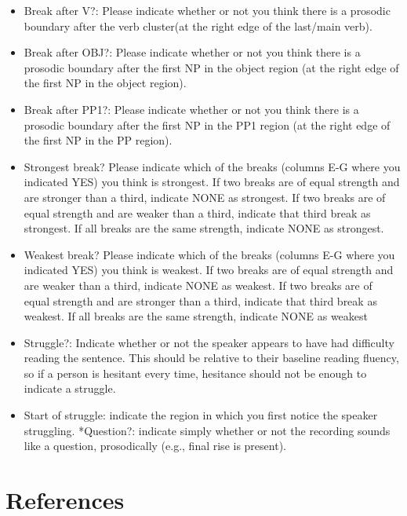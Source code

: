 \documentclass[11pt,oneside]{book}
\providecommand{\tightlist}{%
  \setlength{\itemsep}{0pt}\setlength{\parskip}{0pt}}
\begin{document}
\begin{itemize}
\tightlist
\item
  Break after V?: Please indicate whether or not you think there is a prosodic boundary after the verb cluster(at the right edge of the last/main verb).
\item
  Break after OBJ?: Please indicate whether or not you think there is a prosodic boundary after the first NP in the object region (at the right edge of the first NP in the object region).
\item
  Break after PP1?: Please indicate whether or not you think there is a prosodic boundary after the first NP in the PP1 region (at the right edge of the first NP in the PP region).
\item
  Strongest break? Please indicate which of the breaks (columns E-G where you indicated YES) you think is strongest. If two breaks are of equal strength and are stronger than a third, indicate NONE as strongest. If two breaks are of equal strength and are weaker than a third, indicate that third break as strongest. If all breaks are the same strength, indicate NONE as strongest.
\item
  Weakest break? Please indicate which of the breaks (columns E-G where you indicated YES) you think is weakest. If two breaks are of equal strength and are weaker than a third, indicate NONE as weakest. If two breaks are of equal strength and are stronger than a third, indicate that third break as weakest. If all breaks are the same strength, indicate NONE as weakest
\item
  Struggle?: Indicate whether or not the speaker appears to have had difficulty reading the sentence. This should be relative to their baseline reading fluency, so if a person is hesitant every time, hesitance should not be enough to indicate a struggle.
\item
  Start of struggle: indicate the region in which you first notice the speaker struggling.
  *Question?: indicate simply whether or not the recording sounds like a question, prosodically (e.g., final rise is present).
\end{itemize}

\clearpage

\hypertarget{references}{%
\chapter*{References}\label{references}}

\noindent
\vspace{-2em}
\setlength{\parindent}{-0.5in}
\setlength{\leftskip}{0.5in}
\setlength{\parskip}{15pt}
\end{document}
